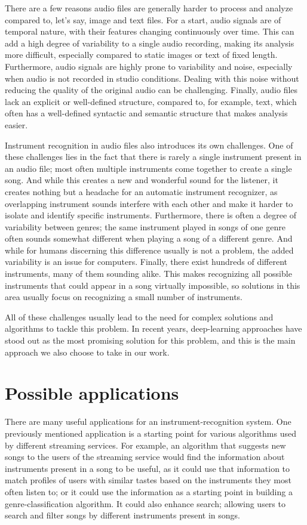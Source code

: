 There are a few reasons audio files are generally harder to process and analyze compared to, let's say, image and text files. For a start, audio signals are of temporal nature, with their features changing continuously over time. This can add a high degree of variability to a single audio recording, making its analysis more difficult, especially compared to static images or text of fixed length. Furthermore,
audio signals are highly prone to variability and noise, especially when audio is not recorded in studio conditions. Dealing with this noise without reducing the quality of the original audio can be challenging. Finally, audio files lack an explicit or well-defined structure, compared to, for example, text, which often has a well-defined syntactic and semantic structure that makes analysis easier.

Instrument recognition in audio files also introduces its own challenges. One of these challenges lies in the fact that there is rarely a single instrument present in an audio file; most often multiple instruments come together to create a single song. And while this creates a new and wonderful sound for the listener, it creates nothing but a headache for an automatic instrument recognizer, as overlapping instrument sounds interfere with each other and make it harder to isolate and identify specific instruments. Furthermore, there is often a degree of variability between genres; the same instrument played in songs of one genre often sounds somewhat different when playing a song of a different genre. And while for humans discerning this difference usually is not a problem, the added variability is an issue for computers. Finally, there exist hundreds of different instruments, many of them sounding alike. This makes recognizing all possible instruments that could appear in a song virtually impossible, so solutions in this area usually focus on recognizing a small number of instruments.

All of these challenges usually lead to the need for complex solutions and algorithms to tackle this problem. In recent years, deep-learning approaches have stood out as the most promising solution for this problem, and this is the main approach we also choose to take in our work.
\section{Possible applications}

There are many useful applications for an instrument-recognition system. One previously mentioned application is a starting point for various algorithms used by different streaming services. For example, an algorithm that suggests new songs to the users of the streaming service would find the information about instruments present in a song to be useful, as it could use that information to match profiles of users with similar tastes based on the instruments they most often listen to; or it could use the information as a starting point in building a genre-classification algorithm. It could also enhance search; allowing users to search and filter songs by different instruments present in songs.

